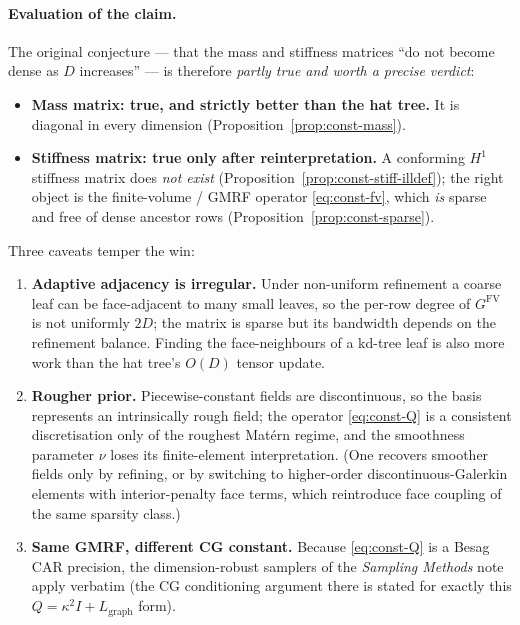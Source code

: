 \documentclass[11pt]{article}
\begin{document}
\paragraph{Evaluation of the claim.}
The original conjecture --- that the mass and stiffness matrices ``do not become
dense as $D$ increases'' --- is therefore \emph{partly true and worth a precise
verdict}:
\begin{itemize}
  \item \textbf{Mass matrix: true, and strictly better than the hat tree.}
        It is diagonal in every dimension (Proposition~\ref{prop:const-mass}).
  \item \textbf{Stiffness matrix: true only after reinterpretation.}  A
        conforming $H^1$ stiffness matrix does \emph{not exist}
        (Proposition~\ref{prop:const-stiff-illdef}); the right object is the
        finite-volume / GMRF operator \eqref{eq:const-fv}, which \emph{is} sparse
        and free of dense ancestor rows (Proposition~\ref{prop:const-sparse}).
\end{itemize}
Three caveats temper the win:
\begin{enumerate}
  \item \textbf{Adaptive adjacency is irregular.}  Under non-uniform refinement a
        coarse leaf can be face-adjacent to many small leaves, so the per-row
        degree of $G^{\mathrm{FV}}$ is not uniformly $2D$; the matrix is sparse
        but its bandwidth depends on the refinement balance.  Finding the
        face-neighbours of a kd-tree leaf is also more work than the hat tree's
        $O(D)$ tensor update.
  \item \textbf{Rougher prior.}  Piecewise-constant fields are discontinuous, so
        the basis represents an intrinsically rough field; the operator
        \eqref{eq:const-Q} is a consistent discretisation only of the roughest
        Mat\'ern regime, and the smoothness parameter $\nu$ loses its
        finite-element interpretation.  (One recovers smoother fields only by
        refining, or by switching to higher-order discontinuous-Galerkin
        elements with interior-penalty face terms, which reintroduce face
        coupling of the same sparsity class.)
  \item \textbf{Same GMRF, different CG constant.}  Because \eqref{eq:const-Q} is
        a Besag CAR precision, the dimension-robust samplers of the
        \emph{Sampling Methods} note apply verbatim (the CG conditioning argument
        there is stated for exactly this $Q=\kappa^2 I + L_{\mathrm{graph}}$
        form).
\end{enumerate}
\end{document}
